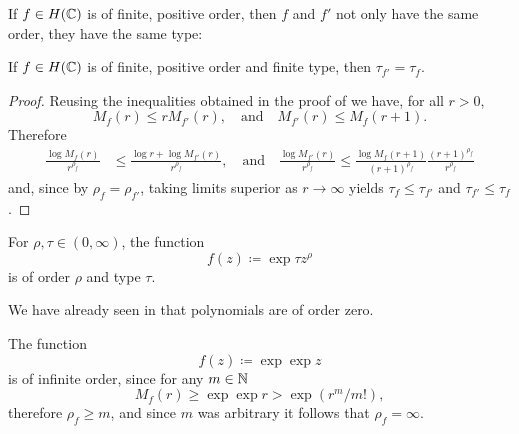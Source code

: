 
If $f \in H(\mathbb{C})$ is of finite, positive order, then $f$ and $f'$ not only have the same order, they have the same type:

\begin{proposition} \label{prop:type-derivative}
    If $f \in H(\mathbb{C})$ is of finite, positive order and finite type, then $\tau_{f'} = \tau_f$.
\end{proposition}

\begin{proof}
    Reusing the inequalities obtained in the proof of  we have, for all $r > 0$,
    \begin{equation*}
        M_f(r) \leq r M_{f'}(r), \quad \textrm{and} \quad M_{f'}(r) \leq M_f(r+1).
    \end{equation*}
    Therefore
    \begin{align*}
        \frac{\log M_f(r)}{r^{\rho_f}} &\leq \frac{\log r + \log M_{f'}(r)}{r^{\rho_f}}, \quad \textrm{and} \quad \frac{\log M_{f'}(r)}{r^{\rho_f}} \leq \frac{\log M_{f}(r+1)}{(r+1)^{\rho_f}} \frac{(r+1)^{\rho_f}}{r^{\rho_f}}
    \end{align*}
    and, since by  $\rho_f = \rho_{f'}$, taking limits superior as $r \to \infty$ yields $\tau_f \leq \tau_{f'}$ and $\tau_{f'} \leq \tau_f$.
\end{proof}

\begin{example} \label{exm:order-and-type}
    \leavevmode
    \begin{arrowlist}
        \item For $\rho, \tau \in (0, \infty)$, the function
        $$ f(z) \coloneqq \exp {\tau z^\rho} $$
        is of order $\rho$ and type $\tau$.
        \item We have already seen in  that polynomials are of order zero.
        \item The function
        $$ f(z) \coloneqq \exp \exp z $$
        is of infinite order, since for any $m \in \mathbb{N}$
        $$ M_f(r) \geq \exp \exp r > \exp (r^m / m!), $$
        therefore $\rho_f \geq m$, and since $m$ was arbitrary it follows that $\rho_f = \infty$.
        \qedhere
    \end{arrowlist}
\end{example}